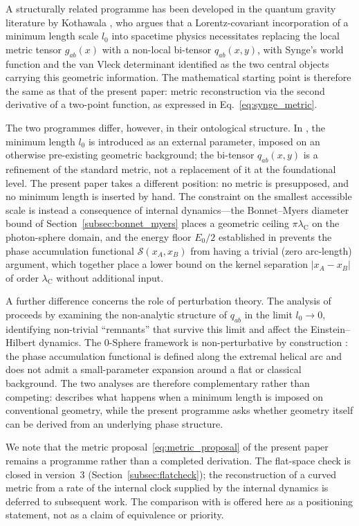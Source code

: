 \documentclass[%
 reprint, amsmath,amssymb, aps, prb, ]{revtex4-2}
\numberwithin{equation}{section}
\newcommand{\lambdaC}{\lambda_{\mathrm{C}}}
\begin{document}
A structurally related programme has been developed in the quantum gravity literature by Kothawala \cite{Kothawala2023}, who argues that a Lorentz-covariant incorporation of a minimum length scale $l_0$ into spacetime physics necessitates replacing the local metric tensor $g_{ab}(x)$ with a non-local bi-tensor $q_{ab}(x,y)$, with Synge's world function and the van Vleck determinant identified as the two central objects carrying this geometric information. The mathematical starting point is therefore the same as that of the present paper: metric reconstruction via the second derivative of a two-point function, as expressed in Eq.~\eqref{eq:synge_metric}.

The two programmes differ, however, in their ontological structure. In \cite{Kothawala2023}, the minimum length $l_0$ is introduced as an external parameter, imposed on an otherwise pre-existing geometric background; the bi-tensor $q_{ab}(x,y)$ is a refinement of the standard metric, not a replacement of it at the foundational level. The present paper takes a different position: no metric is presupposed, and no minimum length is inserted by hand. The constraint on the smallest accessible scale is instead a consequence of internal dynamics---the Bonnet--Myers diameter bound of Section~\ref{subsec:bonnet_myers} places a geometric ceiling $\pi\lambdaC$ on the photon-sphere domain, and the energy floor $E_0/2$ established in \cite{hanamura46} prevents the phase accumulation functional $\mathcal{S}(x_A, x_B)$ from having a trivial (zero arc-length) argument, which together place a lower bound on the kernel separation $|x_A - x_B|$ of order $\lambdaC$ without additional input.

A further difference concerns the role of perturbation theory. The analysis of \cite{Kothawala2023} proceeds by examining the non-analytic structure of $q_{ab}$ in the limit $l_0 \to 0$, identifying non-trivial ``remnants'' that survive this limit and affect the Einstein--Hilbert dynamics. The 0-Sphere framework is non-perturbative by construction \cite{hanamura36}: the phase accumulation functional is defined along the extremal helical arc and does not admit a small-parameter expansion around a flat or classical background. The two analyses are therefore complementary rather than competing: \cite{Kothawala2023} describes what happens when a minimum length is imposed on conventional geometry, while the present programme asks whether geometry itself can be derived from an underlying phase structure.

We note that the metric proposal~\eqref{eq:metric_proposal} of the present paper remains a programme rather than a completed derivation. The flat-space check is closed in version~3 (Section~\ref{subsec:flatcheck}); the reconstruction of a curved metric from a rate of the internal clock supplied by the internal dynamics is deferred to subsequent work. The comparison with \cite{Kothawala2023} is offered here as a positioning statement, not as a claim of equivalence or priority.
\end{document}
